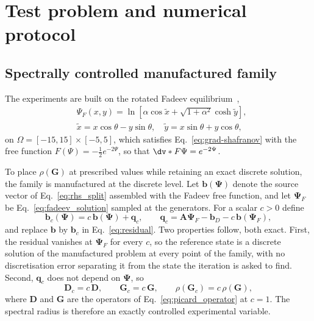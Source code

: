 \section{Test problem and numerical protocol}
\label{sec:experiments}

\subsection{Spectrally controlled manufactured family}
\label{subsec:spectral_controlled_fadeev}

The experiments are built on the rotated Fadeev equilibrium~\cite{Fadeev1965Self-focusingCurrents},
\begin{equation}
\begin{aligned}
&\Psi_F(x,y) = \ln\!\left[ \alpha\cos\widetilde{x} + \sqrt{1+\alpha^2}\cosh\widetilde{y} \right],
\\
&\widetilde{x}=x\cos\theta-y\sin\theta, \quad \widetilde{y}=x\sin\theta+y\cos\theta ,
\end{aligned}
\label{eq:fadeev_solution}
\end{equation}
on $\Omega=[-15,15]\times[-5,5]$, which satisfies Eq.~\eqref{eq:grad-shafranov} with the free function $F(\Psi)=-\tfrac{1}{2}e^{-2\Psi}$, so that $\dv*{F}{\Psi}=e^{-2\Psi}$.

 To place $\rho(\mathbf{G})$ at prescribed values while retaining an exact discrete solution, the family is manufactured at the discrete level. Let $\mathbf{b}(\bm{\Psi})$ denote the source vector of Eq.~\eqref{eq:rhs_split} assembled with the Fadeev free function, and let $\bm{\Psi}_F$ be Eq.~\eqref{eq:fadeev_solution} sampled at the generators. For a scalar $c>0$ define
\begin{equation}
\mathbf{b}_c(\bm{\Psi}) = c\,\mathbf{b}(\bm{\Psi})+\mathbf{q}_c , \qquad \mathbf{q}_c = \mathbf{A}\bm{\Psi}_F-\mathbf{b}_D-c\,\mathbf{b}(\bm{\Psi}_F) ,
\label{eq:manufactured_family}
\end{equation}
and replace $\mathbf{b}$ by $\mathbf{b}_c$ in Eq.~\eqref{eq:residual}. Two properties follow, both exact. First, the residual vanishes at $\bm{\Psi}_F$ for every $c$, so the reference state is a discrete solution of the manufactured problem at every point of the family, with no discretisation error separating it from the state the iteration is asked to find. Second, $\mathbf{q}_c$ does not depend on $\bm{\Psi}$, so
\begin{equation}
\mathbf{D}_c=c\,\mathbf{D}, \qquad \mathbf{G}_c=c\,\mathbf{G}, \qquad \rho(\mathbf{G}_c)=c\,\rho(\mathbf{G}) ,
\label{eq:spectral_scaling}
\end{equation}
where $\mathbf{D}$ and $\mathbf{G}$ are the operators of Eq.~\eqref{eq:picard_operator} at $c=1$. The spectral radius is therefore an exactly controlled experimental variable.

